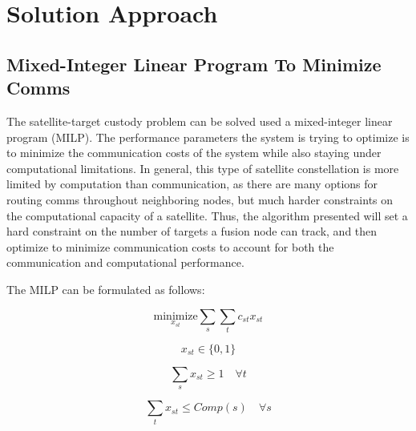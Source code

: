 \section{Solution Approach}

\subsection{Mixed-Integer Linear Program To Minimize Comms}


    The satellite-target custody problem can be solved used a mixed-integer linear program (MILP). 
    The performance parameters the system is trying to optimize is to minimize the communication costs of the system while also staying under computational limitations.
    In general, this type of satellite constellation is more limited by computation than communication, as there are many options for routing comms throughout neighboring nodes, but much harder constraints on the computational capacity of a satellite.
    Thus, the algorithm presented will set a hard constraint on the number of targets a fusion node can track, and then optimize to minimize communication costs to account for both the communication and computational performance.

    The MILP can be formulated as follows:

    \begin{equation}
        \underset{x_{st}}{\text{minimize}} \sum_{s} \sum_{t} c_{st} x_{st}
        \label{eq:objective}
    \end{equation}
    

    \begin{equation}
        x_{st} \in \{0, 1\} 
        \label{eq:binary}
    \end{equation}

    \begin{equation}
        \sum_{s} x_{st} \geq 1 \quad \forall t
        \label{eq:constraint1}
    \end{equation}

    \begin{equation}
        \sum_{t} x_{st} \leq Comp(s) \quad \forall s
        \label{eq:constraint2}
    \end{equation}

